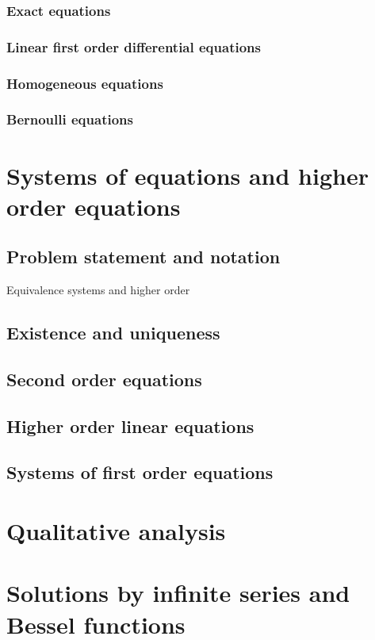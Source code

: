 \subsubsection{Exact equations}
\subsubsection{Linear first order differential equations}
\subsubsection{Homogeneous equations}
\subsubsection{Bernoulli equations}

\section{Systems of equations and higher order equations}
\subsection{Problem statement and notation}
Equivalence systems and higher order
\subsection{Existence and uniqueness}
\subsection{Second order equations}
\subsection{Higher order linear equations}
\subsection{Systems of first order equations}

\section{Qualitative analysis}

\section{Solutions by infinite series and Bessel functions}

